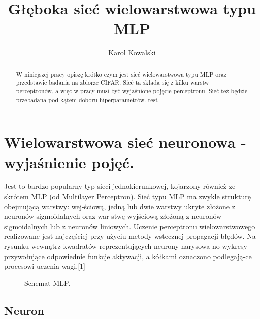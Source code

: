 \documentclass{article}
\title{Głęboka sieć wielowarstwowa typu MLP}
\author{Karol Kowalski}
\begin{document}

\maketitle

\begin{abstract}
  W niniejszej pracy opiszę krótko czym jest sieć wielowarstwowa
  typu MLP oraz przedstawie badania na zbiorze CIFAR.
  Sieć ta składa się z kilku warstw perceptronów, a więc w pracy musi być
  wyjaśnione pojęcie perceptronu. Sieć też będzie przebadana pod kątem
  doboru hiperparametrów. test
\end{abstract}

\section{Wielowarstwowa sieć neuronowa - wyjaśnienie pojęć.}

Jest to bardzo popularny typ sieci jednokierunkowej, kojarzony
również ze skrótem MLP (od Multilayer Perceptron). Sieć typu MLP
ma zwykle strukturę obejmującą warstwy: wej-ściową, jedną lub dwie
warstwy ukryte złożone z neuronów sigmoidalnych oraz war-stwę
wyjściową złożoną z neuronów sigmoidalnych lub z neuronów liniowych.
Uczenie perceptronu wielowarstwowego realizowane jest najczęściej
przy użyciu metody wstecznej propagacji błędów. Na rysunku wewnątrz
kwadratów reprezentujących neurony narysowa-no wykresy przywołujące
odpowiednie funkcje aktywacji, a kółkami oznaczono podlegają-ce procesowi
uczenia wagi.[1]

\begin{figure}[h]
  \centering
  \caption{Schemat MLP.}
\end{figure}

\subsection{Neuron}
\end{document}
